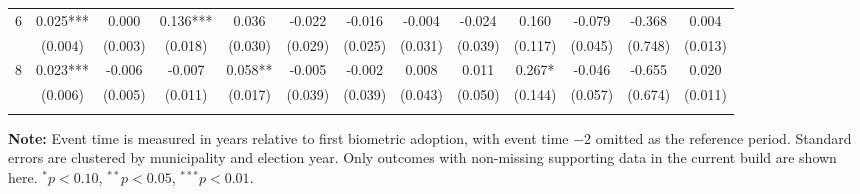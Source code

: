 \begin{table}[htbp]
{\begin{tabular}{lcccccccccccc}
        $6$ & 0.025*** & 0.000 & 0.136*** & 0.036 & -0.022 & -0.016 & -0.004 & -0.024 & 0.160 & -0.079 & -0.368 & 0.004 \\
         & (0.004) & (0.003) & (0.018) & (0.030) & (0.029) & (0.025) & (0.031) & (0.039) & (0.117) & (0.045) & (0.748) & (0.013) \\
        $8$ & 0.023*** & -0.006 & -0.007 & 0.058** & -0.005 & -0.002 & 0.008 & 0.011 & 0.267* & -0.046 & -0.655 & 0.020 \\
         & (0.006) & (0.005) & (0.011) & (0.017) & (0.039) & (0.039) & (0.043) & (0.050) & (0.144) & (0.057) & (0.674) & (0.011) \\
        \doublebottomrule
    \end{tabular}
    }
    \vspace{0.8em}
    \begin{minipage}{\textwidth}
        {\footnotesize \textbf{Note:} Event time is measured in years relative to first biometric adoption, with event time $-2$ omitted as the reference period. Standard errors are clustered by municipality and election year. Only outcomes with non-missing supporting data in the current build are shown here. $^{*} p<0.10$, $^{**} p<0.05$, $^{***} p<0.01$. \par}
    \end{minipage}
\end{table}
